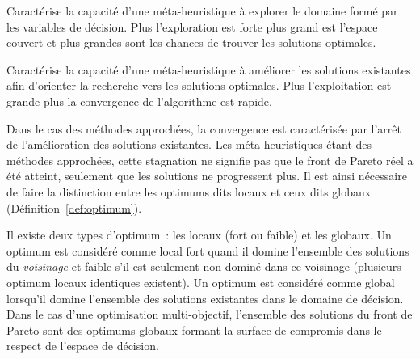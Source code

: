 \begin{Def}[Exploration]\label{def:exploration}
Caractérise la capacité d’une méta-heuristique à explorer le domaine formé par les
variables de décision. Plus l’exploration est forte plus grand est l’espace couvert
et plus grandes sont les chances de trouver les solutions optimales.
\end{Def}

\begin{Def}[Exploitation]\label{def:exploitation}
Caractérise la capacité d’une méta-heuristique à améliorer les solutions existantes
afin d’orienter la recherche vers les solutions optimales. Plus l’exploitation est
grande plus la convergence de l’algorithme est rapide.
\end{Def}

\begin{Def}[Convergence]\label{def:convergence}
Dans le cas des méthodes approchées, la convergence est caractérisée par l’arrêt
de l’amélioration des solutions existantes. Les méta-heuristiques étant des
méthodes approchées, cette stagnation ne signifie pas que le front de Pareto réel
a été atteint, seulement que les solutions ne progressent plus. Il est ainsi
nécessaire de faire la distinction entre les optimums dits locaux et ceux dits
globaux (Définition~\ref{def:optimum}).
\end{Def}

\begin{Def}\label{def:optimum}
Il existe deux types d’optimum~: les locaux (fort ou faible) et les globaux. Un
optimum est considéré comme local fort quand il domine l’ensemble des solutions du
\emph{voisinage} et faible s’il est seulement non-dominé dans ce voisinage (plusieurs
optimum locaux identiques existent). Un optimum est considéré comme global
lorsqu’il domine l’ensemble des solutions existantes dans le domaine de
décision. Dans le cas d’une optimisation multi-objectif, l’ensemble des
solutions du front de Pareto sont des optimums globaux formant la surface de
compromis dans le respect de l’espace de décision.
\end{Def}

